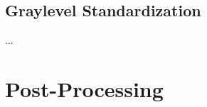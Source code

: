 
\subsection{Graylevel Standardization}\label{ss:meth-ystd}
\par...\par
\clearpage
\section{Post-Processing}\label{s:meth-post}

\clearpage
